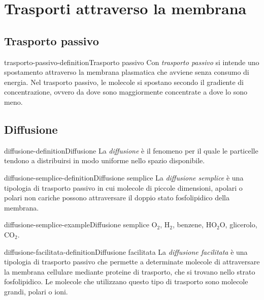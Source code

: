 \documentclass[preview]{standalone}
\begin{document}
\section{Trasporti attraverso la membrana}

\subsection{Trasporto passivo}

\begin{snippetdefinition}{trasporto-passivo-definition}{Trasporto passivo}
    Con \textit{trasporto passivo} si intende uno spostamento attraverso
    la membrana plasmatica che avviene senza consumo di energia.
    Nel trasporto passivo, le molecole si spostano secondo il gradiente di concentrazione,
    ovvero da dove sono maggiormente concentrate a dove lo sono meno.
\end{snippetdefinition}


\subsection{Diffusione}

\begin{snippetdefinition}{diffusione-definition}{Diffusione}
    La \textit{diffusione} è il fenomeno per il quale le particelle tendono a distribuirsi in modo
    uniforme nello spazio disponibile.
\end{snippetdefinition}

\begin{snippetdefinition}{diffusione-semplice-definition}{Diffusione semplice}
    La \textit{diffusione semplice} è una tipologia di trasporto passivo in cui molecole di piccole dimensioni, apolari o polari
    non cariche possono attraversare il doppio stato fosfolipidico della membrana.
\end{snippetdefinition}

\begin{snippetexample}{diffusione-semplice-example}{Diffusione semplice}
    O\({}_2\), H\({}_2\), benzene, HO\({}_2\)O, glicerolo, CO\({}_2\).
\end{snippetexample}

\begin{snippetdefinition}{diffusione-facilitata-definition}{Diffusione facilitata}
    La \textit{diffusione facilitata} è una tipologia di trasporto passivo che permette a determinate molecole di attraversare la
    membrana cellulare mediante proteine di trasporto, che si trovano nello strato fosfolipidico.
    Le molecole che utilizzano questo tipo di trasporto sono molecole grandi, polari o ioni.
\end{snippetdefinition}
\end{document}
